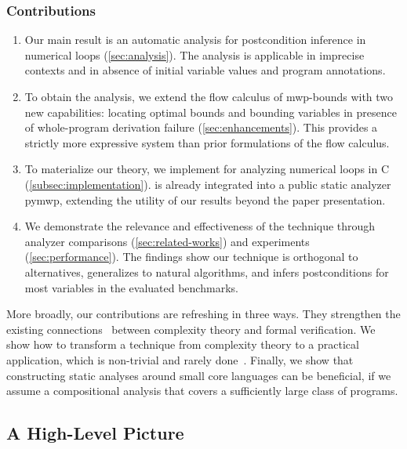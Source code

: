 \subsubsection{Contributions}
\label{subsec:contributions}

\begin{enumerate}

\item Our main result is an automatic analysis for postcondition inference in numerical loops (\autoref{sec:analysis}).
The analysis is applicable in imprecise contexts and in absence of initial variable values and program annotations.

\item To obtain the analysis, we extend the flow calculus of mwp-bounds with two new capabilities:
locating optimal bounds and bounding variables in presence of whole-program derivation failure (\autoref{sec:enhancements}).
This provides a {strictly more expressive system} than prior formulations of the flow calculus.

\item To materialize our theory, we implement \impl for analyzing numerical loops in C (\autoref{subsec:implementation}).
\impl is already integrated into a public static analyzer pymwp, extending the utility of our results beyond the paper presentation.

\item We demonstrate the relevance and effectiveness of the technique through
analyzer comparisons (\autoref{sec:related-works}) and experiments (\autoref{sec:performance}).
The findings show our technique is orthogonal to alternatives,
generalizes to natural algorithms, and infers postconditions for most variables in the evaluated benchmarks.

\end{enumerate}

More broadly, our contributions are refreshing in three ways.
They strengthen the existing connections~\cite{nguyen2017,nguyen2014} {between} complexity theory and formal verification.
We show how to transform a technique from complexity theory to a practical application, which is non-trivial and rarely done~\cite{moyen2017,aubert20222}.
Finally, we show that constructing static analyses around small core languages %
can be beneficial, if we assume a {compositional} analysis that covers a sufficiently large class of programs.

\subsection{A High-Level Picture}
\label{sec:prelim}

